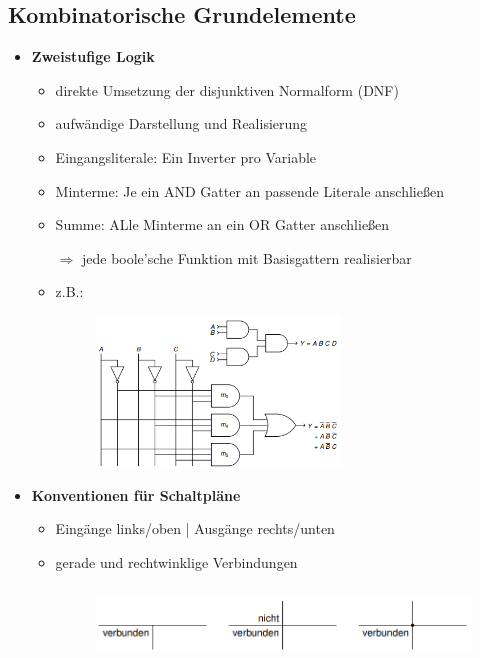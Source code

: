 \documentclass[11pt,a4paper]{article}
\begin{document}
\subsection{Kombinatorische Grundelemente}
\begin{itemize}

\item \textbf{Zweistufige Logik}
	\begin{itemize}
	\item direkte Umsetzung der disjunktiven Normalform (DNF)
	\item aufwändige Darstellung und Realisierung
	\item Eingangsliterale: Ein Inverter pro Variable
	\item Minterme: Je ein AND Gatter an passende Literale anschließen
	\item Summe: ALle Minterme an ein OR Gatter anschließen
	\item[$\Rightarrow$] jede boole'sche Funktion mit Basisgattern realisierbar
	\item z.B.:
	\item[] \begin{figure}[H]
				\begin{center}
				\includegraphics[height=4cm]{zweistufigelogik}
				\end{center}
			\end{figure}
	\end{itemize}

\item \textbf{Konventionen für Schaltpläne}
	\begin{itemize}
	\item Eingänge links/oben | Ausgänge rechts/unten
	\item gerade und rechtwinklige Verbindungen
	\item[] \begin{figure}[H]
				\begin{center}
				\includegraphics[height=2cm]{konventionen}
				\end{center}
			\end{figure}
	\end{itemize}


\end{itemize}
\end{document}

